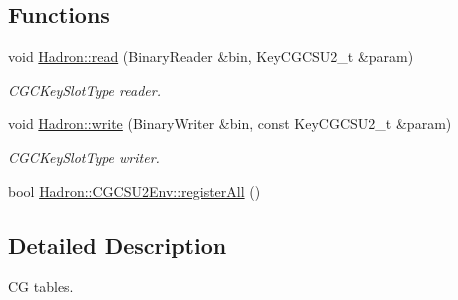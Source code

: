 \subsection*{Functions}
\begin{DoxyCompactItemize}
\item 
void \mbox{\hyperlink{namespaceHadron_a5f60c1536ae1aac0334573f8a80eb687}{Hadron\+::read}} (Binary\+Reader \&bin, Key\+C\+G\+C\+S\+U2\+\_\+t \&param)
\begin{DoxyCompactList}\small\item\em C\+G\+C\+Key\+Slot\+Type reader. \end{DoxyCompactList}\item 
void \mbox{\hyperlink{namespaceHadron_aeadf04c31606521c48ee674d28e2ca3e}{Hadron\+::write}} (Binary\+Writer \&bin, const Key\+C\+G\+C\+S\+U2\+\_\+t \&param)
\begin{DoxyCompactList}\small\item\em C\+G\+C\+Key\+Slot\+Type writer. \end{DoxyCompactList}\item 
bool \mbox{\hyperlink{namespaceHadron_1_1CGCSU2Env_abd79304b8b72ab5ae3e0ede4ecd647a5}{Hadron\+::\+C\+G\+C\+S\+U2\+Env\+::register\+All}} ()
\end{DoxyCompactItemize}


\subsection{Detailed Description}
CG tables. 

